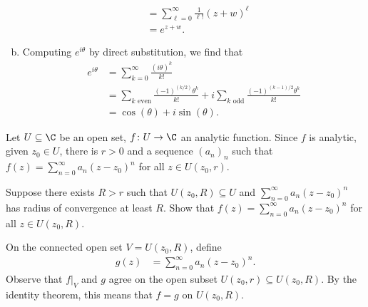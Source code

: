 \documentclass[10pt]{mypackage}
\begin{document}
\begin{solution}
\begin{enumerate}[(a)]
\begin{align*}
                                                                                                                  &= \sum_{\ell = 0}^{\infty} \frac{1}{\ell!} \left( z+w \right)^{\ell}\\
                                                                                                                  &= e^{z+w}.
      \end{align*}
    \item Computing $e^{i\theta}$ by direct substitution, we find that
      \begin{align*}
        e^{i\theta} &= \sum_{k=0}^{\infty} \frac{\left( i\theta \right)^{k}}{k!}\\
                    &= \sum_{k\text{ even}} \frac{\left( -1 \right)^{(k/2)}\theta^{k}}{k!} + i\sum_{k\text{ odd}} \frac{\left( -1 \right)^{\left( k-1 \right)/2}\theta^{k}}{k!}\\
                    &= \cos\left( \theta \right) + i\sin\left( \theta \right).
      \end{align*}
  \end{enumerate}
\end{solution}
\begin{problem}[Problem 2]
  Let $U\subseteq \C$ be an open set, $f\colon U\rightarrow \C$ an analytic function. Since $f$ is analytic, given $z_0\in U$, there is $r > 0$ and a sequence $\left( a_n \right)_n$ such that $f(z) = \sum_{n=0}^{\infty}a_n\left( z-z_0 \right)^{n}$ for all $z\in U\left( z_0,r \right)$.\newline

  Suppose there exists $R > r$ such that $U\left( z_0,R \right) \subseteq U$ and $\sum_{n=0}^{\infty}a_n\left( z-z_0 \right)^{n}$ has radius of convergence at least $R$. Show that $f(z) = \sum_{n=0}^{\infty}a_n\left( z-z_0 \right)^{n}$ for all $z\in U\left( z_0,R \right)$.
\end{problem}
\begin{solution}
  On the connected open set $V = U\left( z_0,R \right)$, define
  \begin{align*}
    g(z) &= \sum_{n=0}^{\infty}a_n\left( z-z_0 \right)^{n}.
  \end{align*}
  Observe that $f|_{V}$ and $g$ agree on the open subset $U\left( z_0,r \right)\subseteq U\left( z_0,R \right)$. By the identity theorem, this means that $f = g$ on $U\left( z_0,R \right)$.
\end{solution}
\end{document}
